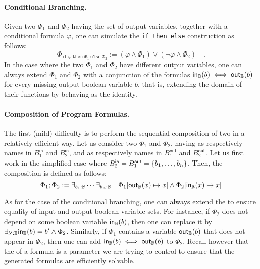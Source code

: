 \paragraph{Conditional Branching.} 
Given two  $\Phi_1$ and $\Phi_2$ having 
the set of output variables,
together with a conditional formula $\varphi$, one can 
simulate the \texttt{if then else} construction 
as follows:
\begin{equation*}
    \Phi_{\texttt{if}~\varphi~\texttt{then}~\Phi_1~\texttt{else}~\Phi_2} := (\varphi \land \Phi_1) \lor (\neg \varphi \land \Phi_2) \quad .
\end{equation*}
In the case where the two  $\Phi_1$ and $\Phi_2$ have
different output variables, one can always extend $\Phi_1$ and $\Phi_2$ with
a conjunction of the
formulas $\mathsf{in}_{\mathbb{B}}(b) \iff \mathsf{out}_{\mathbb{B}}(b)$ for every missing output boolean variable $b$,
that is, extending the domain of their functions by behaving as the identity.

\paragraph{Composition of Program Formulas.} The first (mild) difficulty is to
perform the sequential composition of two  in a relatively
efficient way. Let us consider two  $\Phi_1$ and $\Phi_2$,
having as  respectively names in
$B_1^{\mathsf{in}}$ and $B_2^{\mathsf{in}}$, and as  respectively names in $B_1^{\mathsf{out}}$ and $B_2^{\mathsf{out}}$.
Let us first work in 
the simplified case where $B_2^{\mathsf{in}} =
B_1^{\mathsf{out}} = \{ b_1, \dots, b_n \}$.
Then, the composition is
defined as follows:
\begin{equation*}
    \Phi_1 ; \Phi_2 :=
    \exists_{b_1 : \mathbb{B}} \cdots \exists_{b_n : \mathbb{B}}
    \quad
    \Phi_1[ \mathsf{out}_{\mathbb{B}}(x) \mapsto x ]
    \wedge 
    \Phi_2[ \mathsf{in}_{\mathbb{B}}(x) \mapsto x ]
\end{equation*}

As for the case of the conditional branching, one can always extend the
 to ensure equality of input and output boolean variable
sets. For instance, if $\Phi_2$ does not depend on some boolean variable
$\mathsf{in}_{\mathbb{B}}(b)$, then one can replace it by $\exists_{b' : \mathbb{B}} \mathsf{in}_{\mathbb{B}}(b) =
b' \wedge \Phi_2$. Similarly, if $\Phi_1$ contains a variable $\mathsf{out}_{\mathbb{B}}(b)$ that
does not appear in $\Phi_2$, then one can add $\mathsf{in}_{\mathbb{B}}(b) \iff \mathsf{out}_{\mathbb{B}}(b)$ to
$\Phi_2$. Recall however that the  of a formula is a
parameter we are trying to control to ensure that the generated formulas are
efficiently solvable.

